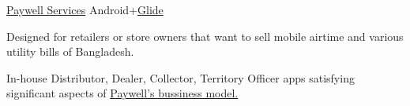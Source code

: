 \begin{projectentries}
    \projectentry 
    {\href{https://play.google.com/store/apps/details?id=com.cloudwell.paywell.services}{Paywell Services}} 
    {Android+{\href{https://github.com/bumptech/glide}{Glide}}}
    {
      \begin{projectitems} %
        \item {Designed for retailers or store owners that want to sell mobile airtime and various utility bills of Bangladesh.}
        \item {In-house Distributor, Dealer, Collector, Territory Officer 
        apps satisfying significant aspects of 
        {\href{https://futurestartup.com/2018/03/13/the-evolution-of-cloudwell-clouldwells-strategy-and-ambition-an-interview-with-anisul-islam-founder-and-ceo-cloudwell/}
        {Paywell's bussiness model.}}}
      \end{projectitems}
    }


\end{projectentries}
